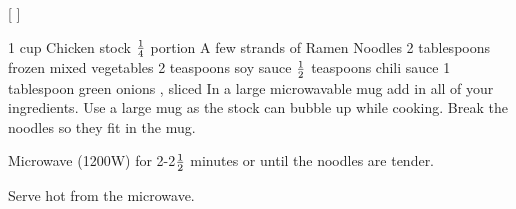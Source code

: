 
[
]

\begin{step}
1 cup Chicken stock
$\frac{1}{4}$ portion A few strands of Ramen Noodles
2 tablespoons frozen mixed vegetables
2 teaspoons soy sauce
$\frac{1}{2}$ teaspoons chili sauce
1 tablespoon green onions , sliced
\method
In a large microwavable mug add in all of your ingredients. Use a large mug as the stock can bubble up while cooking. Break the noodles so they fit in the mug.

Microwave (1200W) for 2-2$\frac{1}{2}$ minutes or until the noodles are tender.

Serve hot from the microwave.
\end{step}
